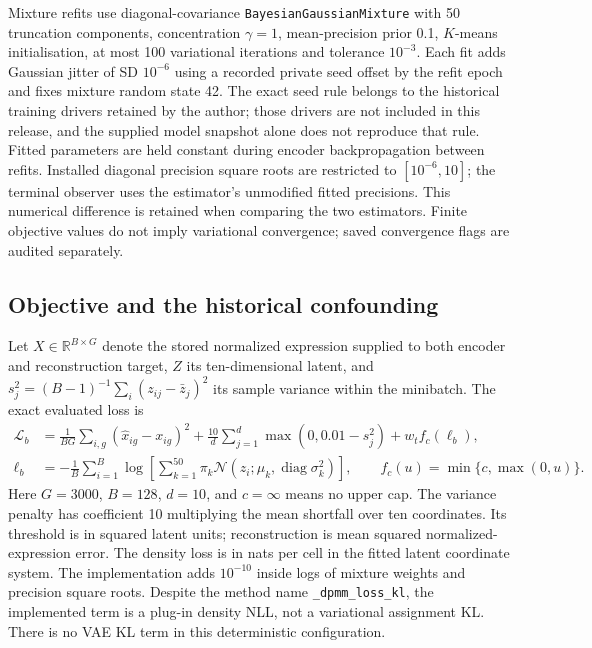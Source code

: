 \documentclass[11pt]{article}
\begin{document}
Mixture refits use diagonal-covariance \texttt{BayesianGaussianMixture} with 50 truncation components, concentration $\gamma=1$, mean-precision prior 0.1, $K$-means initialisation, at most 100 variational iterations and tolerance $10^{-3}$. Each fit adds Gaussian jitter of SD $10^{-6}$ using a recorded private seed offset by the refit epoch and fixes mixture random state 42. The exact seed rule belongs to the historical training drivers retained by the author; those drivers are not included in this release, and the supplied model snapshot alone does not reproduce that rule. Fitted parameters are held constant during encoder backpropagation between refits. Installed diagonal precision square roots are restricted to $[10^{-6},10]$; the terminal observer uses the estimator's unmodified fitted precisions. This numerical difference is retained when comparing the two estimators. Finite objective values do not imply variational convergence; saved convergence flags are audited separately.

\subsection{Objective and the historical confounding}
Let $X\in\mathbb R^{B\times G}$ denote the stored normalized expression supplied to both encoder and reconstruction target, $Z$ its ten-dimensional latent, and $s_j^2=(B-1)^{-1}\sum_i(z_{ij}-\bar z_j)^2$ its sample variance within the minibatch. The exact evaluated loss is
\begin{align}
 \mathcal L_b&=\frac{1}{BG}\sum_{i,g}(\hat x_{ig}-x_{ig})^2
       +\frac{10}{d}\sum_{j=1}^{d}\max(0,0.01-s_j^2)
       +w_t f_c(\ell_b),\label{eq:loss}\\
 \ell_b&=-\frac1B\sum_{i=1}^B\log\left[\sum_{k=1}^{50}
       \pi_k\mathcal N(z_i;\mu_k,\operatorname{diag}\sigma_k^2)\right],\qquad
 f_c(u)=\min\{c,\max(0,u)\}.\label{eq:gate}
\end{align}
Here $G=3000$, $B=128$, $d=10$, and $c=\infty$ means no upper cap. The variance penalty has coefficient 10 multiplying the mean shortfall over ten coordinates. Its threshold is in squared latent units; reconstruction is mean squared normalized-expression error. The density loss is in nats per cell in the fitted latent coordinate system. The implementation adds $10^{-10}$ inside logs of mixture weights and precision square roots. Despite the method name \texttt{\_dpmm\_loss\_kl}, the implemented term is a plug-in density NLL, not a variational assignment KL. There is no VAE KL term in this deterministic configuration.
\end{document}
